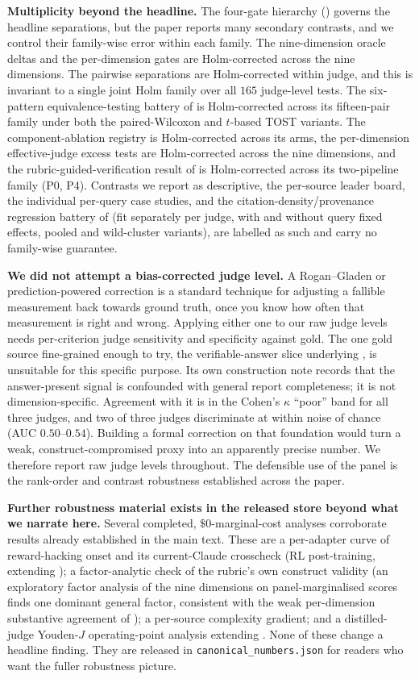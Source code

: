 \documentclass[11pt]{article}
\begin{document}
\textbf{Multiplicity beyond the headline.} The four-gate hierarchy () governs the
headline separations, but the paper reports many secondary contrasts, and we control their
family-wise error within each family. The
nine-dimension oracle deltas and the per-dimension gates are Holm-corrected across the nine
dimensions. The pairwise separations are Holm-corrected within judge, and this is invariant
to a single joint Holm family over all $165$ judge-level tests. The six-pattern
equivalence-testing battery of  is Holm-corrected across its fifteen-pair
family under both the paired-Wilcoxon and $t$-based TOST variants. The component-ablation
registry is Holm-corrected across its arms, the per-dimension effective-judge excess tests
are Holm-corrected across the nine dimensions, and the rubric-guided-verification result of
 is Holm-corrected across its two-pipeline family (P0, P4).
Contrasts we report as descriptive, the per-source leader board, the individual per-query case
studies, and the citation-density/provenance regression battery of  (fit
separately per judge, with and without query fixed effects, pooled and wild-cluster variants), are
labelled as such and carry no family-wise guarantee.

\textbf{We did not attempt a bias-corrected judge level.} A Rogan--Gladen or prediction-powered
correction is a standard technique for adjusting a fallible measurement back towards ground
truth, once you know how often that measurement is right and wrong. Applying either one to
our raw judge levels needs per-criterion judge sensitivity and specificity against gold. The one gold source fine-grained enough to try, the verifiable-answer slice underlying
, is unsuitable for this specific purpose. Its own construction note
records that the answer-present signal is confounded with general report completeness; it is
not dimension-specific. Agreement with it is in the Cohen's $\kappa$ ``poor'' band for all
three judges, and two of three judges discriminate at within noise of chance (AUC $0.50$--$0.54$).
Building a formal correction on that foundation would turn a weak, construct-compromised proxy
into an apparently precise number. We
therefore report raw judge levels throughout. The defensible use of the panel is the
rank-order and contrast robustness established across the paper.

\textbf{Further robustness material exists in the released store beyond what we narrate here.}
Several completed, $\$0$-marginal-cost analyses corroborate results already established in the
main text. These are a per-adapter
curve of reward-hacking onset and its current-Claude crosscheck (RL post-training, extending
); a factor-analytic check of the rubric's own construct validity (an
exploratory factor analysis of the nine dimensions on panel-marginalised scores finds one dominant
general factor, consistent with the weak per-dimension substantive agreement of
); a per-source complexity gradient; and a distilled-judge Youden-$J$ operating-point
analysis extending . None of these change a headline finding. They are released
in \texttt{canonical\_numbers.json} for readers who want the fuller robustness picture.
\end{document}
